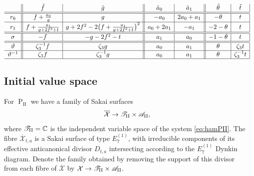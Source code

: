 \documentclass[a4paper,reqno]{amsart}
\numberwithin{equation}{section}
\newcommand{\C}{\mathbb{C}}
\newcommand{\pain}[1]{\operatorname{P}_{\mathrm{#1}}}
\numberwithin{equation}{section}
\begin{document}
\begin{table}[h]
    \begin{equation*}
    \begin{array}{c||c|c||c|c||c|c|}
               & \tilde{f}     & \tilde{g}     & \tilde{a}_0   & \tilde{a}_1  & \tilde{\theta} & \tilde{t}\\
        \hline\hline 
        r_0    & f + \frac{a_0}{g}    & g  & -a_0   & 2a_0+a_1   & -\theta &  t  \\
        \hline
        r_1    & f + \frac{a_1}{g+2f^2+t}    & g+2 f^2 - 2 \big(f + \frac{a_1}{g+2f^2+t}\big)^2  & a_0+2a_1   & -a_1   & -2 -\theta   & t
        \\
        \hline \hline
        \sigma   & - f    & - g - 2 f^2 - t & a_1   & a_0   & -1-\theta    & t \\
        \hline\hline       
        \vartheta   & \zeta_3^{-1} f    & \zeta_3 g & a_0   & a_1   & \theta    &  \zeta_3 t\\
        \hline
        \vartheta^{-1}   & \zeta_3 f   & \zeta_3^{-1} g  & a_0   & a_1   & \theta    & \zeta_3^{-1} t \\
        \hline
    \end{array}
    \end{equation*}
    \caption{Symmetries of $\pain{II}$ on variables $(f,g)$, parameter $\theta$, root variables $a$ and independent variable $t$.}
    \label{tab:PII:symmetry:varsandparams}
\end{table}
\endgroup




\subsection{Initial value space}

For $\pain{II}$ we have a family of Sakai surfaces
\begin{equation*}
    \overline{\mathcal{X}} \to \mathscr{T}_{\rm{II}}\times \mathscr{A}_{\rm{II}},
\end{equation*}
where $\mathscr{T}_{\rm{II}}= \C$ is the independent variable space of the system \eqref{eq:hamPII}.
The fibre $\overline{\mathcal{X}}_{t,a}$ is a Sakai surface of type $E_7^{(1)}$, with irreducible components of its effective anticanonical divisor $D_{t,a}$ intersecting according to the $E_7^{(1)}$ Dynkin diagram.
Denote the family obtained by removing the support of this divisor from each fibre of $\overline{\mathcal{X}}$ by $\mathscr{\mathcal{X}}\to \mathscr{T}_{\rm{II}}\times \mathscr{A}_{\rm{II}}$. 
\end{document}
